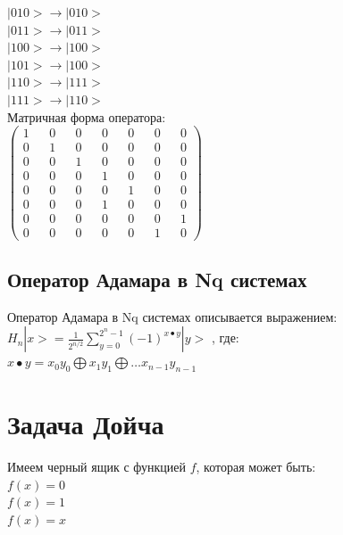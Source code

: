 \documentclass[11pt]{report}
\begin{document}
$|010> \rightarrow |010>$ \\

$|011> \rightarrow |011>$ \\

$|100> \rightarrow |100>$ \\

$|101> \rightarrow |100>$ \\

$|110> \rightarrow |111>$ \\

$|111> \rightarrow |110>$ \\

Матричная форма оператора: \\

$\begin{pmatrix}
1&&0&&0&&0&&0&&0&&0\\
0 && 1 && 0 && 0 && 0 && 0 && 0 \\
0 && 0 && 1 && 0 && 0 && 0 && 0 \\
0 && 0 && 0 && 1 && 0 && 0 && 0 \\
0 && 0 && 0 && 0 && 1 && 0 && 0 \\
0 && 0 && 0 && 1 && 0 && 0 && 0 \\
0 && 0 && 0 && 0 && 0 && 0 && 1 \\
0 && 0 && 0 && 0 && 0 && 1 && 0 \end{pmatrix}$

\subsection{Оператор Адамара в Nq системах}
Оператор Адамара в Nq системах описывается выражением: \\

$H_n|x> = \frac{1}{2^{n/2}}\sum\limits_{y=0}^{2^n-1} (-1)^{x\bullet y}|y>$ , где: \\

$x\bullet y = x_0y_0 \bigoplus x_1y_1 \bigoplus \dots x_{n-1}y_{n-1}$


\section{Задача Дойча}
Имеем черный ящик с функцией $f$, которая может быть:\\

$f(x) = 0$ \\

$f(x) = 1$ \\

$f(x) = x$ \\
\end{document}
